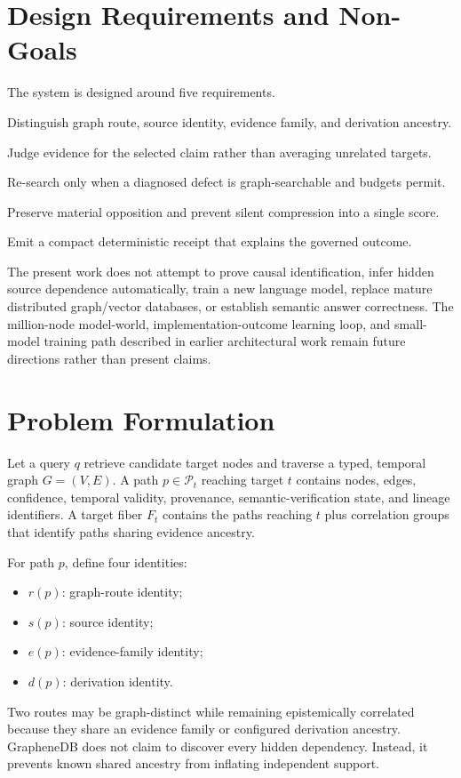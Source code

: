 \documentclass[10pt]{article}
\newcommand{\paths}{\mathcal{P}}
\begin{document}
\section{Design Requirements and Non-Goals}
The system is designed around five requirements.
\begin{description}[leftmargin=3.1cm,style=nextline]
  \item[Lineage separation] Distinguish graph route, source identity, evidence family, and derivation ancestry.
  \item[Target scope] Judge evidence for the selected claim rather than averaging unrelated targets.
  \item[Bounded recovery] Re-search only when a diagnosed defect is graph-searchable and budgets permit.
  \item[Contradiction visibility] Preserve material opposition and prevent silent compression into a single score.
  \item[Durable accountability] Emit a compact deterministic receipt that explains the governed outcome.
\end{description}

The present work does not attempt to prove causal identification, infer hidden source dependence automatically, train a new language model, replace mature distributed graph/vector databases, or establish semantic answer correctness. The million-node model-world, implementation-outcome learning loop, and small-model training path described in earlier architectural work remain future directions rather than present claims.

\section{Problem Formulation}
Let a query $q$ retrieve candidate target nodes and traverse a typed, temporal graph $G=(V,E)$. A path $p\in\paths_t$ reaching target $t$ contains nodes, edges, confidence, temporal validity, provenance, semantic-verification state, and lineage identifiers. A target fiber $F_t$ contains the paths reaching $t$ plus correlation groups that identify paths sharing evidence ancestry.

For path $p$, define four identities:
\begin{itemize}[leftmargin=*]
  \item $r(p)$: graph-route identity;
  \item $s(p)$: source identity;
  \item $e(p)$: evidence-family identity;
  \item $d(p)$: derivation identity.
\end{itemize}
Two routes may be graph-distinct while remaining epistemically correlated because they share an evidence family or configured derivation ancestry. GrapheneDB does not claim to discover every hidden dependency. Instead, it prevents known shared ancestry from inflating independent support.
\end{document}
